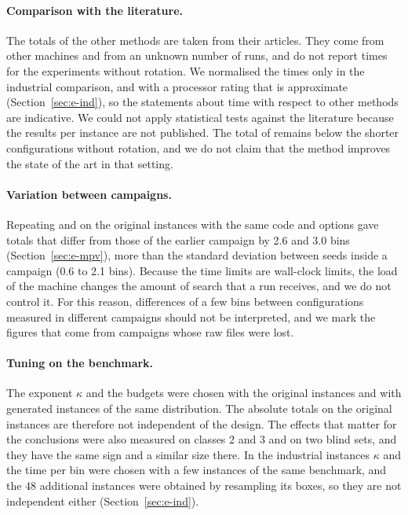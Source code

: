 \paragraph{Comparison with the literature.}
The totals of the other methods are taken from their articles. They come from other machines and from an unknown number of runs, and \citet{Mahvash2018} do not report times for the experiments without rotation. We normalised the times only
in the industrial comparison, and with a processor rating that is approximate (Section~\ref{sec:e-ind}), so the statements about time with respect to other methods are indicative. We could not apply statistical tests against the literature because the results per instance
are not published. The total of \citet{Mahvash2018} remains below the shorter configurations without rotation, and we do not claim that the method improves the state of the art in that setting.

\paragraph{Variation between campaigns.}
Repeating \cfgfast{} and \cfgbal{} on the original instances with the same code and options gave totals that differ from those of the earlier campaign by 2.6 and 3.0 bins (Section~\ref{sec:e-mpv}), more than the standard deviation between seeds inside a campaign (0.6 to 2.1 bins).
Because the time limits are wall-clock limits, the load of the machine changes the amount of search that a run receives, and we do not control it. For this reason, differences of a few bins between configurations measured in different campaigns should not be interpreted, and we
mark the figures that come from campaigns whose raw files were lost.

\paragraph{Tuning on the benchmark.}
The exponent $\kappa$ and the budgets were chosen with the original instances and with generated instances of the same distribution. The absolute totals on the original instances are therefore not independent of the design. The effects that matter for the conclusions
were also measured on classes 2 and 3 and on two blind sets, and they have the same sign and a similar size there. In the industrial instances $\kappa$ and the time per bin were chosen with a few instances of the same benchmark, and the 48 additional instances
were obtained by resampling its boxes, so they are not independent either (Section~\ref{sec:e-ind}).

